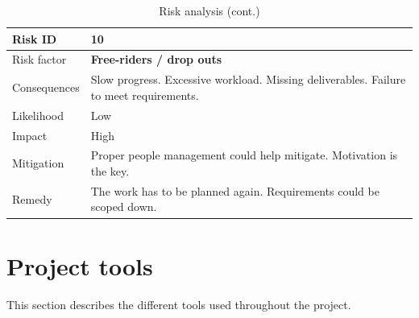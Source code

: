 \begin{table}[h]
\begin{tabular}{ | l | p{11.5cm} | }
  
  Risk ID & \textbf{10} \\
  \hline\noalign{\smallskip}\hline
  Risk factor   & \textbf{Free-riders / drop outs} \\
  Consequences  & Slow progress. Excessive workload. Missing deliverables. Failure to meet requirements. \\
  Likelihood    & Low \\
  Impact        & High \\
  Mitigation    & Proper people management could help mitigate. \newline
                  Motivation is the key. \\
  Remedy        & The work has to be planned again. \newline
                  Requirements could be scoped down. \\
  \hline

\end{tabular}
\caption{Risk analysis (cont.)}
\end{table}

\clearpage
\section{Project tools}
\label{section:tools}
This section describes the different tools used throughout the project.

